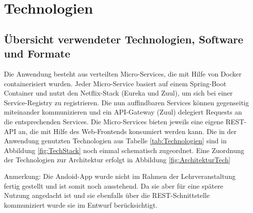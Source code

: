 
\section{Technologien}

\subsection{Übersicht verwendeter Technologien, Software  \newline und Formate}


Die Anwendung besteht aus verteilten Micro-Services, die mit Hilfe von Docker containerisiert wurden. Jeder Micro-Service basiert auf einem Spring-Boot Container und nutzt den Netflix-Stack (Eureka und Zuul), um sich bei einer Service-Registry zu registrieren. Die nun auffindbaren Services können gegenseitig miteinander kommunizieren und ein API-Gateway (Zuul) delegiert Requests an die entsprechenden Services.
Die Micro-Services bieten jeweils eine eigene REST-API an, die mit Hilfe des Web-Frontends konsumiert werden kann. 
Die in der Anwendung genutzten Technologien aus Tabelle \ref{tab:Technologien}  sind in Abbildung \ref{fig:TechStack} noch einmal schematisch zugeordnet. 
Eine Zuordnung der Technologien zur Architektur erfolgt in Abbildung \ref{fig:ArchitekturTech}

Anmerkung: Die Andoid-App wurde nicht im Rahmen der Lehrveranstaltung fertig gestellt und ist somit noch ausstehend. Da sie aber für eine spätere Nutzung angedacht ist und sie ebenfalls über die REST-Schnittstelle kommuniziert wurde sie im Entwurf berücksichtigt. 

